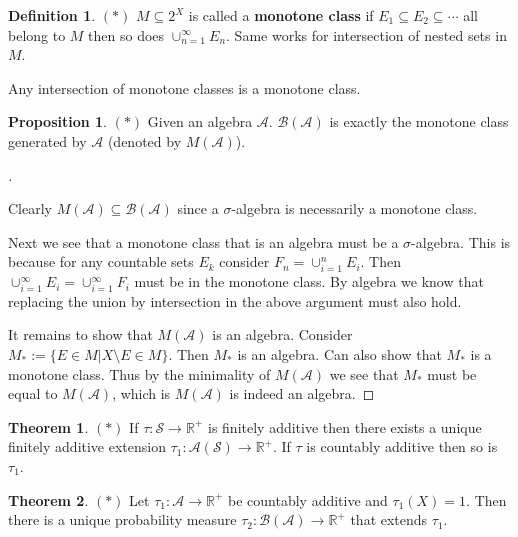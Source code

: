 \documentclass{article}
\theoremstyle{definition}
\newtheorem{thm}{Theorem}
\newtheorem{dfn}{Definition}
\newtheorem{prop}{Proposition}
\newenvironment{proofs}[1][\proofname]{%
  \begin{proof}[#1]$ $\par\nobreak\ignorespaces
}{%
  \end{proof}
}
\newcommand{\RR}{\mathbb R}
\begin{document}
\begin{dfn}
	$(*)$
	$M \subseteq 2^X$ is called a \textbf{monotone class} if $E_1 \subseteq E_2 \subseteq \cdots$ all belong to $M$ then so does $\cup_{n = 1}^\infty E_n$.
	Same works for intersection of nested sets in $M$.
\end{dfn}

Any intersection of monotone classes is a monotone class.

\begin{prop}
	$(*)$
	Given an algebra $\mathscr{A}$.
	$\mathscr{B}(\mathscr{A})$ is exactly the monotone class generated by $\mathscr{A}$ (denoted by $M(\mathscr{A})$).
\end{prop}

\begin{proofs}
	Clearly $M(\mathscr{A}) \subseteq \mathscr{B}(\mathscr{A})$ since a $\sigma$-algebra is necessarily a monotone class.

	\par Next we see that a monotone class that is an algebra must be a $\sigma$-algebra.
	This is because for any countable sets $E_k$ consider $F_n = \cup_{i = 1}^n E_i$.
	Then $\cup_{i = 1}^\infty E_i = \cup_{i = 1}^\infty F_i$ must be in the monotone class.
	By algebra we know that replacing the union by intersection in the above argument must also hold.

	\par It remains to show that $M(\mathscr{A})$ is an algebra.
	Consider $M_* := \{E \in M| X \setminus E \in M\}$.
	Then $M_*$ is an algebra.
	Can also show that $M_*$ is a monotone class.
	Thus by the minimality of $M(\mathscr{A})$ we see that $M_*$ must be equal to $M(\mathscr{A})$, which is $M(\mathscr{A})$ is indeed an algebra.
\end{proofs}

\begin{thm}
	$(*)$
	If $\tau: \mathscr{S} \to \RR^+$ is finitely additive then there exists a unique finitely additive extension $\tau_1: \mathscr{A}(\mathscr{S}) \to \RR^+$.
	If $\tau$ is countably additive then so is $\tau_1$.
\end{thm}

\begin{thm}
	$(*)$
	Let $\tau_1: \mathscr{A} \to \RR^+$ be countably additive and $\tau_1(X) = 1$.
	Then there is a unique probability measure  $\tau_2: \mathscr{B}(\mathscr{A}) \to \RR^+$ that extends $\tau_1$.	
\end{thm}
\end{document}
